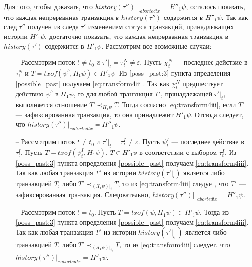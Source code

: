 \begin{myproof}
Для того, чтобы доказать, что $history(\tau'')|_{\neg abortedtx} = H''_1\psi$, осталось показать, что каждая непрерванная транзакция в $history(\tau'')$ содержится в $H''_1\psi$. Так как след $\tau''$ получен из следа $\tau'$ изменением статуса транзакций, принадлежащих истории $H'_1\psi$, достаточно показать, что каждая непрерванная транзакция в $history(\tau')$ содержится в $H'_1\psi$. Рассмотрим все возможные случаи:
\begin{itemize}
\item[--] Рассмотрим поток $t \neq t_0$ и $\tau'|_t = \tau^N_t \neq \varepsilon$. Пусть $\chi^N_t$ --- последнее действие в $\tau^N_t$ и $T = txof(\psi^b, H_1\psi) \in H'_1\psi$. Из \ref{poss_past:3} пункта определения \ref{possible_past} получаем \eqref{eq:transform4iii}. Так как $\chi^N_t$ предшествует действию $\psi^b$ в $H_1\psi$, то для любой транзакция $T'$, принадлежащей $\tau'|_t$, выполняется отношение $T' \prec_{H_1\psi} T$. Тогда согласно \eqref{eq:transform4iii}, если $T'$ --- зафиксированная транзакция, то она принадлежит $H'_1\psi$. Отсюда следует, что $history(\tau'')|_{\neg abortedtx} = H''_1\psi$.
\item[--] Рассмотрим поток $t \neq t_0$ и $\tau'|_t = \tau^I_t \neq \varepsilon$. Пусть $\psi^I_t$ --- последнее действие в $\tau^I_t$. Пусть $T = txof(\psi^I_t, H_1\psi)$. $T \in H'_1\psi$ в соответствии с выбором $\tau^I_t$. Из \ref{poss_past:3} пункта определения \ref{possible_past} получаем \eqref{eq:transform4iii}. Так как любая транзакция $T'$ из истории $history(\tau'|_t)$ является либо транзакцией $T$, либо $T' \prec_{(H_1\psi)|_t} T$, то из \eqref{eq:transform4iii} следует, что $T'$ --- зафиксированная транзакция. Следовательно, $history(\tau'')|_{\neg abortedtx} = H''_1\psi$.
\item[--] Рассмотрим поток $t = t_0$. Пусть $T = txof(\psi, H_1\psi) \in H'_1\psi$. Тогда из \ref{poss_past:3} пункта определения \ref{possible_past} получаем \eqref{eq:transform4iii}. Так как любая транзакция $T'$ из истории $history(\tau'|_{t_0})$ является либо транзакцией $T$, либо $T' \prec_{(H_1\psi)|_{t_0}} T$, то из \eqref{eq:transform4iii} следует, что $history(\tau'')|_{\neg abortedtx} = H''_1\psi$.
\end{itemize}
\end{myproof}

